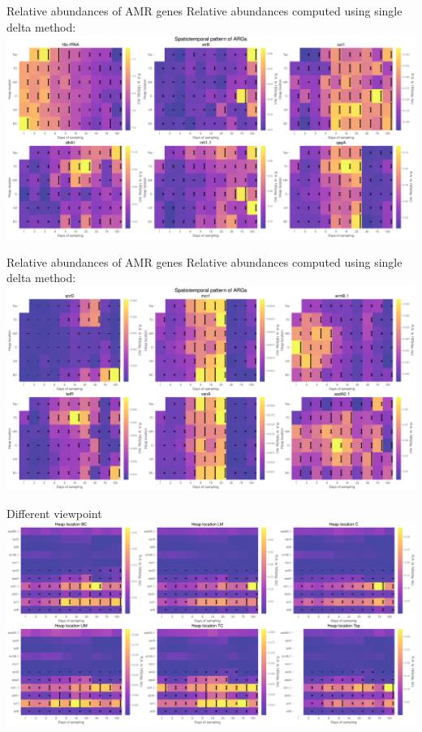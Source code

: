 \documentclass[mathserif,11pt]{beamer}
\begin{document}
\begin{frame}{Relative abundances of AMR genes}
Relative abundances computed using single delta method:
	\includegraphics[width=\textwidth]{Figures/Sian_spatial_variation_first6_assays_with_errorbar.png}
\end{frame}
\begin{frame}{Relative abundances of AMR genes}
Relative abundances computed using single delta method:
	\includegraphics[width=\textwidth]{Figures/Sian_spatial_variation_second6_assays_with_errorbar.png}
\end{frame}
\begin{frame}{Different viewpoint}
\includegraphics[width=\textwidth]{Figures/Sian_populations_in_positions_no_16s.png}
\end{frame}
\end{document}
